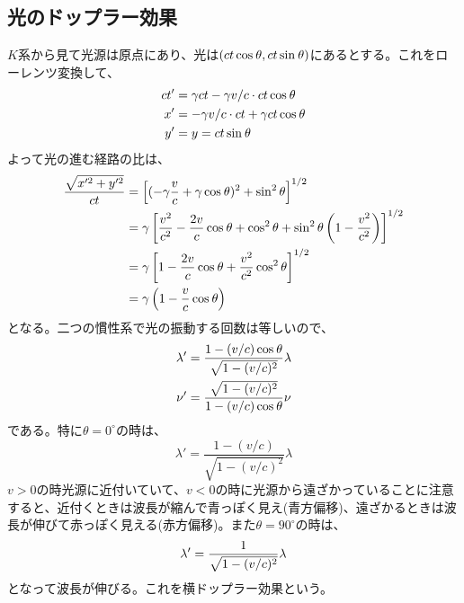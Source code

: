        \subsection{光のドップラー効果}
            $K$系から見て光源は原点にあり、光は$(ct\co,ct\si)$にあるとする。これをローレンツ変換して、
            \begin{align*}
                ct' &= \ga ct-\ga v/c\cdot ct\co\\
                x' &= -\ga v/c\cdot ct+\ga ct\co\\
                y' &= y = ct\si
            \end{align*}
            よって光の進む経路の比は、
            \begin{align*}
                \frac{\sqrt{x'^2+y'^2}}{ct} &= \llr{
                (-\ga\frac{v}{c}+\ga\co)^2+\si[2]}^{1/2}\\
                &= \ga\llr{\frac{v^2}{c^2}-\frac{2v}{c}\co+\co[2]+\si[2]\lr{1-\frac{v^2}{c^2}}}^{1/2}\\
                &= \ga\llr{1-\frac{2v}{c}\co+\frac{v^2}{c^2}\co[2]}^{1/2}\\
                &= \ga\lr{1-\frac{v}{c}\co}
            \end{align*}
            となる。二つの慣性系で光の振動する回数は等しいので、
            \begin{gather*}
                \lambda' = \frac{1-(v/c)\co}{\sqrt{1-(v/c)^2}}\lambda\\
                \nu' = \frac{\sqrt{1-(v/c)^2}}{1-(v/c)\co}\nu
            \end{gather*}
            である。特に$\theta=0^{\circ}$の時は、
                \[\lambda' = \frac{1-(v/c)}{\sqrt{1-(v/c)^2}}\lambda\]
            $v>0$の時光源に近付いていて、$v<0$の時に光源から遠ざかっていることに注意すると、近付くときは波長が縮んで青っぽく見え(青方偏移)、遠ざかるときは波長が伸びて赤っぽく見える(赤方偏移)。また$\theta=90^{\circ}$の時は、
                \[\lambda' = \rec{\sqrt{1-(v/c)^2}}\lambda\]
            となって波長が伸びる。これを横ドップラー効果という。